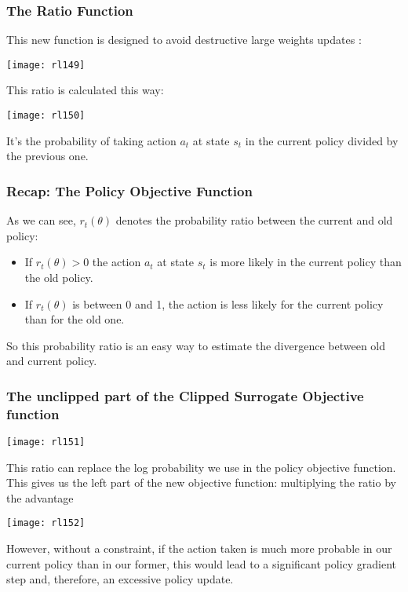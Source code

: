 \begin{frame}[fragile]\frametitle{The Ratio Function}

This new function is designed to avoid destructive large weights updates :

\begin{center}
\texttt{[image: rl149]}
\end{center}



This ratio is calculated this way:

\begin{center}
\texttt{[image: rl150]}
\end{center}

It's the probability of taking action $a_t$ at state $s_t$ in the current policy divided by the previous one.

\end{frame}


\begin{frame}[fragile]\frametitle{Recap: The Policy Objective Function}

As we can see, $r_t(\theta)$ denotes the probability ratio between the current and old policy:

\begin{itemize}
\item If $r_t(\theta) > 0$ the action $a_t$ at state $s_t$ is more likely in the current policy than the old policy.
\item If $r_t(\theta)$ is between 0 and 1, the action is less likely for the current policy than for the old one.
\end{itemize}

So this probability ratio is an easy way to estimate the divergence between old and current policy.

\end{frame}

\begin{frame}[fragile]\frametitle{The unclipped part of the Clipped Surrogate Objective function}

\begin{center}
\texttt{[image: rl151]}
\end{center}


This ratio can replace the log probability we use in the policy objective function. This gives us the left part of the new objective function: multiplying the ratio by the advantage

\begin{center}
\texttt{[image: rl152]}
\end{center}

However, without a constraint, if the action taken is much more probable in our current policy than in our former, this would lead to a significant policy gradient step and, therefore, an excessive policy update.
\end{frame}

